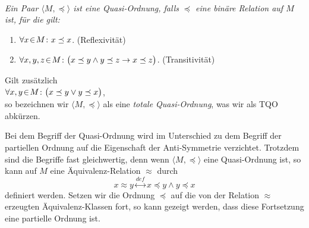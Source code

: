 \begin{Definition}  \hspace*{\fill} \\
{\em
  Ein Paar $\langle M, \preceq\rangle$ ist eine \emph{Quasi-Ordnung}, falls $\preceq$ eine
  bin\"are Relation auf $M$ ist, f\"ur die gilt:
  \begin{enumerate}
  \item $\forall x \!\in\! M \colon x \preceq x$. \hspace*{\fill} (Reflexivit\"at)
  \item $\forall x, y, z \!\in\! M \colon \bigl(x \preceq y \wedge y \preceq z \rightarrow x \preceq z\bigr)$. 
         \hspace*{\fill} (Transitivit\"at)
  \end{enumerate}
  Gilt zus\"atzlich \\[0.2cm]
  \hspace*{1.3cm} $\forall x, y \!\in\! M \colon \bigl(x \preceq y \vee y \preceq x\bigr)$, \\[0.2cm]
  so bezeichnen wir $\langle M, \preceq \rangle$ als eine \emph{totale Quasi-Ordnung}, was
  wir als \textsc{TQO} abk\"urzen.
}
\end{Definition}
Bei dem Begriff der Quasi-Ordnung wird im Unterschied zu dem Begriff der partiellen Ordnung auf die
Eigenschaft der Anti-Symmetrie verzichtet.  Trotzdem sind die Begriffe fast gleichwertig, denn wenn
$\langle M, \preceq \rangle$ eine Quasi-Ordnung ist, so kann auf $M$ eine Äquivalenz-Relation
$\approx$ durch 
\[ x \approx y \stackrel{def}{\longleftrightarrow} x \preceq y \wedge y \preceq x \]
definiert werden.
Setzen wir die Ordnung $\preceq$ auf die von der Relation $\approx$ erzeugten Äquivalenz-Klassen
fort,  so kann gezeigt werden, dass diese Fortsetzung eine partielle Ordnung ist.
\vspace*{0.3cm}


